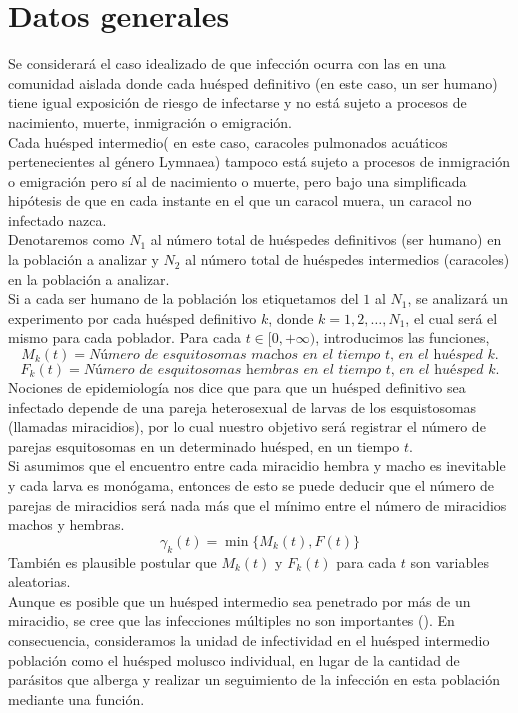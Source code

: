 \section{Datos generales}
\label{datos-generales} 
Se considerará el caso idealizado de que infección ocurra con las en una comunidad aislada donde cada huésped definitivo (en este caso, un ser humano) tiene igual exposición de riesgo de infectarse y no está sujeto a procesos de nacimiento, muerte, inmigración o emigración.\\
Cada huésped intermedio( en este caso, caracoles pulmonados acuáticos pertenecientes al género Lymnaea) tampoco está sujeto a procesos de inmigración o emigración pero sí al de nacimiento o muerte, pero bajo una simplificada hipótesis de que en cada instante en el que un caracol muera, un caracol no infectado nazca.\\
Denotaremos como $N_1$ al número total de huéspedes definitivos (ser humano) en la población a analizar y $N_2$ al número total de huéspedes intermedios (caracoles) en la población a analizar.\\
Si a cada ser humano de la población los etiquetamos del $1$ al $N_1$, se analizará un experimento por cada huésped definitivo $k$, donde $k=1,2,\ldots,N_1$, el cual será el mismo para cada poblador.
Para cada $t\in[0,+\infty)$, introducimos las funciones,
$$M_k(t)= \textit{Número de esquitosomas machos en el tiempo t, en el huésped k.}$$
$$F_k(t)=\textit{Número de esquitosomas hembras en el tiempo t, en el huésped k.}$$
Nociones de epidemiología nos dice que para que un huésped definitivo sea infectado depende de una pareja heterosexual de larvas de los esquistosomas (llamadas miracidios), por lo cual nuestro objetivo será registrar el número de parejas esquitosomas en un determinado huésped, en un tiempo $t$.\\Si asumimos que el encuentro entre cada miracidio hembra y macho es inevitable y cada larva es monógama, entonces de esto se puede deducir que el número de parejas de miracidios será nada más que el mínimo entre el número de miracidios machos y hembras.
$$\gamma_k(t)=\min\{M_k(t),F(t)\}$$
También es plausible postular que $M_k(t)$ y $F_k(t)$ para cada $t$ son variables aleatorias.\\
Aunque es posible que un huésped intermedio sea penetrado por más de un miracidio, se cree que las infecciones múltiples no son importantes (\cite{JordanyWebbe}). En consecuencia, consideramos la unidad de infectividad en el huésped intermedio población como el huésped molusco individual, en lugar de la cantidad de parásitos que alberga y realizar un seguimiento de la infección en esta población mediante una función.\\
